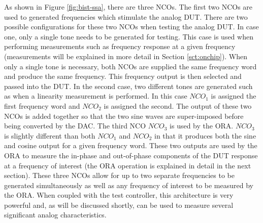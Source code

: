 \documentclass[12pt]{report}
\begin{document}
As shown in Figure \ref{fig:bist-ssa}, there are three NCOs.  The first two NCOs are used to generated frequencies which stimulate the analog DUT.  There are two possible configurations for these two NCOs when testing the analog DUT.  In case one, only a single tone needs to be generated for testing.  This case is used when performing measurements such as frequency response at a given frequency (measurements will be explained in more detail in Section \ref{sct:onchip}\cite{jie-journal}).  When only a single tone is necessary, both NCOs are supplied the same frequency word and produce the same frequency\cite{jie}.  This frequency output is then selected and passed into the DUT.  In the second case, two different tones are generated such as when a linearity measurement is performed.  In this case $NCO_1$ is assigned the first frequency word and $NCO_2$ is assigned the second.  The output of these two NCOs is added together so that the two sine waves are super-imposed before being converted by the DAC\cite{jie}.  The third NCO $NCO_3$ is used by the ORA.  $NCO_3$ is slightly different than both $NCO_1$ and $NCO_2$ in that it produces both the sine and cosine output for a given frequency word.  These two outputs are used by the ORA to measure the in-phase and out-of-phase components of the DUT response at a frequency of interest (the ORA operation is explained in detail in the next section)\cite{jie}.   These three NCOs allow for up to two separate frequencies to be generated simultaneously as well as any frequency of interest to be measured by the ORA.  When coupled with the test controller, this architecture is very powerful and, as will be discussed shortly, can be used to measure several significant analog characteristics.
\end{document}
